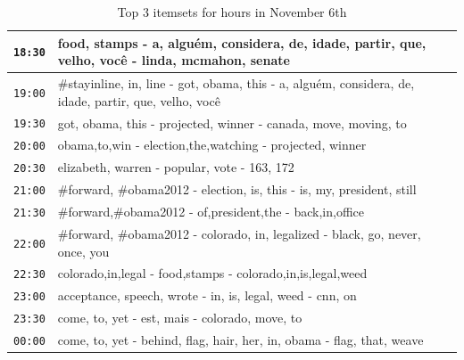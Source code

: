 \documentclass{sig-alternate}
\begin{document}
\begin{table}
\begin{center}
\begin{tabular}{|p{.6cm}|p{7.5cm}|}
\texttt{18:30} & food, stamps - a, algu\'{e}m, considera, de, idade, partir, que,  velho, voc\^{e}  - linda, mcmahon, senate \\\hline 
\texttt{19:00} & \#stayinline, in, line - got, obama, this - a, algu\'{e}m, considera, de, idade, partir, que, velho, voc\^{e} \\\hline 
\texttt{19:30} & got, obama, this - projected, winner - canada, move, moving, to \\\hline 
\texttt{20:00} & obama,to,win - election,the,watching - projected, winner \\\hline
\texttt{20:30} & elizabeth, warren - popular, vote - 163, 172 \\\hline 
\texttt{21:00} & \#forward, \#obama2012 - election, is, this - is, my, president, still \\\hline 
\texttt{21:30} & \#forward,\#obama2012 - of,president,the - back,in,office \\\hline 
\texttt{22:00} & \#forward, \#obama2012 - colorado, in, legalized - black, go, never, once, you \\\hline 
\texttt{22:30} & colorado,in,legal - food,stamps - colorado,in,is,legal,weed \\\hline 
\texttt{23:00} & acceptance, speech, wrote - in, is, legal, weed - cnn, on \\\hline 
\texttt{23:30} & come, to, yet - est, mais - colorado, move, to \\\hline 
\texttt{00:00} & come, to, yet - behind, flag, hair, her, in, obama - flag, that, weave \\\hline
 \end{tabular}
 \caption{Top 3 itemsets for hours in November 6th}
 \label{table:nov6}
 \end{center}
 \end{table}
 
 
 
  
 
\end{document}
